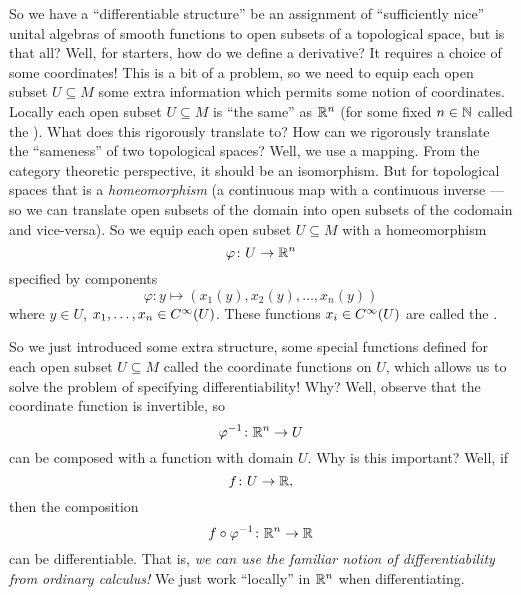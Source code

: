 So we have a ``differentiable structure'' be an assignment of
``sufficiently nice'' unital algebras of smooth functions to open
subsets of a topological space, but is that all? Well, for
starters, how do we define a derivative? It requires a choice of
some coordinates! This is a bit of a problem, so we need to equip
each open subset $U\subseteq M$ some extra information which
permits some notion of coordinates. Locally each open subset
$U\subseteq M$ is ``the same'' as $\Bbb{R}^{n}$ (for some fixed
$n\in\Bbb{N}$ called the ).  What does this rigorously translate to? How can
we rigorously translate the ``sameness'' of two topological
spaces? Well, we use a mapping. From the category theoretic
perspective, it should be an isomorphism. But for topological
spaces that is a \emph{homeomorphism} (a continuous map with a
continuous inverse --- so we can translate open subsets of the
domain into open subsets of the codomain and vice-versa). So we
equip each open subset $U\subseteq M$ with a homeomorphism
\begin{equation}
\varphi\colon U\to\Bbb{R}^{n}
\end{equation}
specified by components
\begin{equation}
\varphi\colon y\mapsto (x_{1}(y), x_{2}(y), \ldots, x_{n}(y))
\end{equation}
where $y\in U$, $x_{1},\ldots,x_{n}\in\diff(U)$. These functions
$x_{i}\in\diff(U)$ are called the .

So we just introduced some extra structure, some special
functions defined for each open subset $U\subseteq M$ called the
coordinate functions on $U$, which allows us to solve the problem
of specifying differentiability! Why? Well, observe that the
coordinate function is invertible, so
\begin{equation}
\varphi^{-1}\colon\Bbb{R}^{n}\to U
\end{equation}
can be composed with a function with domain $U$. Why is this
important? Well, if 
\begin{equation}
f\colon U\to\Bbb{R},
\end{equation}
then the composition
\begin{equation}
f\circ\varphi^{-1}\colon\Bbb{R}^{n}\to\Bbb{R}
\end{equation}
can be differentiable. That is, \emph{we can use the familiar
 notion of differentiability from ordinary calculus!} We just
work ``locally'' in $\Bbb{R}^{n}$ when differentiating.

